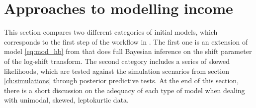 \section{Approaches to modelling income}
\label{ch:initial}
This section compares two different categories of initial models, which corresponds to the first step of the workflow in \cite{gelman_bayesian_2020}.
The first one is an extension of model \ref{eq:mod_hb} from \cite{morelli_hierarchical_2021} that does full Bayesian inference on the shift parameter of the log-shift transform.
The second category includes a series of skewed likelihoods, which are tested against the simulation scenarios from section \ref{ch:simulations} through posterior predictive tests.
At the end of this section, there is a short discussion on the adequacy of each type of model when dealing with unimodal, skewed, leptokurtic data.



